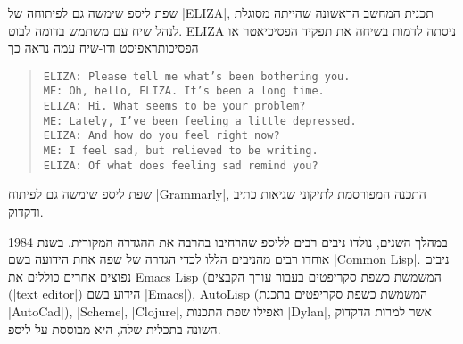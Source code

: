 שפת ליספ שימשה גם לפיתוחה של \E|ELIZA|, תכנית המחשב הראשונה שהייתה מסוגלת לנהל
שיח עם משתמש בדומה לבוט. ELIZA ניסתה לדמות בשיחה את תפקיד הפסיכיאטר או
הפסיכותראפיסט ודו-שיח עמה נראה כך

\begin{quote}
  \begin{minipage}{0.8\textwidth}
  \begin{LTR}
    \scriptsize
    \begin{verbatim}
ELIZA: Please tell me what’s been bothering you.
ME: Oh, hello, ELIZA. It’s been a long time.
ELIZA: Hi. What seems to be your problem?
ME: Lately, I’ve been feeling a little depressed.
ELIZA: And how do you feel right now?
ME: I feel sad, but relieved to be writing.
ELIZA: Of what does feeling sad remind you?
\end{verbatim}
  \end{LTR}
\end{minipage}
\end{quote}
שפת ליספ שימשה גם לפיתוח \E|Grammarly|, התכנה המפורסמת לתיקוני שגיאות כתיב
ודקדוק.

במהלך השנים, נולדו ניבים רבים לליספ שהרחיבו בהרבה את ההגדרה המקורית. בשנת 1984
אוחדו רבים מהניבים הללו לכדי הגדרה של שפה אחת הידועה בשם \E|Common Lisp|. ניבים
נפוצים אחרים כוללים את Emacs Lisp (המשמשת כשפת סקריפטים בעבור עורך הקבצים
(\E|text editor|) הידוע בשם \E|Emacs|), AutoLisp (המשמשת כשפת סקריפטים בתכנת
\E|AutoCad|), \E|Scheme|, \E|Clojure|, ואפילו שפת התכנות \E|Dylan|, אשר למרות
הדקדוק השונה בתכלית שלה, היא מבוססת על ליספ.

